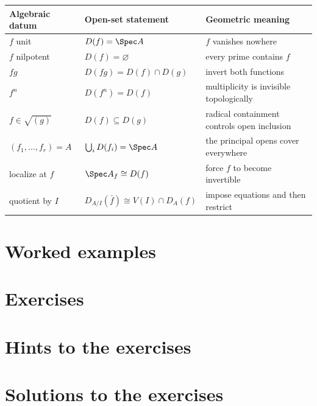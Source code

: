 \begin{center}
\renewcommand{\arraystretch}{1.22}
\begin{tabular}{p{}p{}p{}}
\toprule
\textbf{Algebraic datum} & \textbf{Open-set statement} & \textbf{Geometric meaning}\\
\midrule
$f$ unit & $D(f)=\Spec A$ & $f$ vanishes nowhere\\
$f$ nilpotent & $D(f)=\varnothing$ & every prime contains $f$\\
$fg$ & $D(fg)=D(f)\cap D(g)$ & invert both functions\\
$f^n$ & $D(f^n)=D(f)$ & multiplicity is invisible topologically\\
$f\in\sqrt{(g)}$ & $D(f)\subseteq D(g)$ & radical containment controls open inclusion\\
$(f_1,\dots,f_r)=A$ & $\bigcup_iD(f_i)=\Spec A$ & the principal opens cover everywhere\\
localize at $f$ & $\Spec A_f\cong D(f)$ & force $f$ to become invertible\\
quotient by $I$ & $D_{A/I}(\bar f)\cong V(I)\cap D_A(f)$ & impose equations and then restrict\\
\bottomrule
\end{tabular}
\end{center}

\section{Worked examples}


\section{Exercises}


\ifdefined\IncludeExerciseHints
\section*{Hints to the exercises}

\fi

\ifdefined\IncludeExerciseSolutions
\section*{Solutions to the exercises}

\fi


